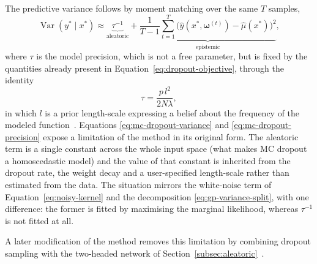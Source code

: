 The predictive variance follows by moment matching over the same $T$ samples,
%
\begin{equation}
    \operatorname{Var}\!\left(y^\ast \mid x^\ast\right)
    \approx
    \underbrace{\tau^{-1}}_{\text{aleatoric}}
    +
    \underbrace{\frac{1}{T-1} \sum_{t=1}^{T}
      \bigl( \hat{y}(x^\ast, \boldsymbol{\omega}^{(t)})
             - \hat{\mu}(x^\ast) \bigr)^2}_{\text{epistemic}} ,
    \label{eq:mc-dropout-variance}
\end{equation}
%
where $\tau$ is the model precision, which is not a free parameter, but is
fixed by the quantities already present in Equation~\eqref{eq:dropout-objective}, through the identity
%
\begin{equation}
    \tau = \frac{p\, l^2}{2 N \lambda} ,
    \label{eq:mc-dropout-precision}
\end{equation}
%
in which $l$ is a prior length-scale expressing a belief about the frequency of the modeled function~\cite{gal2016appendix}. Equations \eqref{eq:mc-dropout-variance} and \eqref{eq:mc-dropout-precision} expose a limitation of the method in its original form. The aleatoric term is a single
constant across the whole input space (what makes MC dropout a homoscedastic model) and the value of that constant is inherited from the dropout rate, the weight decay and a user-specified length-scale rather than estimated from the data. The situation mirrors the white-noise term of Equation~\eqref{eq:noisy-kernel} and the decomposition \eqref{eq:gp-variance-split}, with one difference: the former is fitted by maximising the marginal likelihood, whereas $\tau^{-1}$ is
not fitted at all.

A later modification of the method removes this limitation by combining dropout
sampling with the two-headed network of
Section~\ref{subsec:aleatoric}~\cite{kendall2017}.

